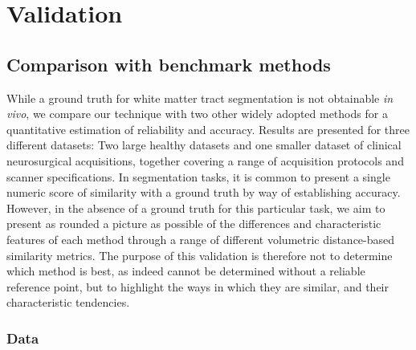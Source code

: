\section{Validation}


\subsection{Comparison with benchmark methods}


While a ground truth for white matter tract segmentation is not obtainable \textit{in vivo}, we compare our technique with two other widely adopted methods for a quantitative estimation of reliability and accuracy.
Results are presented for three different datasets: Two large healthy datasets and one smaller dataset of clinical neurosurgical acquisitions, together covering a range of acquisition protocols and scanner specifications.
In segmentation tasks, it is common to present a single numeric score of similarity with a ground truth by way of establishing accuracy.
However, in the absence of a ground truth for this particular task, we aim to present as rounded a picture as possible of the differences and characteristic features of each method through a range of different volumetric distance-based similarity metrics.
The purpose of this validation is therefore not to determine which method is best, as indeed cannot be determined without a reliable reference point, but to highlight the ways in which they are similar, and their characteristic tendencies.

\subsubsection{Data}

